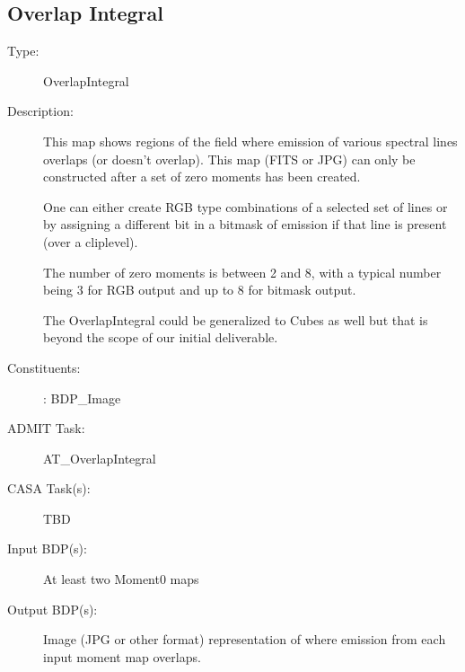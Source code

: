 \subsection{Overlap Integral}
\begin{description}
\item[Type:] OverlapIntegral
\item[Description:]

This map shows regions of the field where emission of various spectral
lines overlaps (or doesn't overlap). This map (FITS or JPG) can only be
constructed after a set of zero moments has been created.  

One can either create RGB type combinations of a selected set of lines
or by assigning a different bit in a bitmask of emission if that line is
present (over a cliplevel).

The number of zero moments is between 2 and 8, with a typical number
being 3 for RGB output and up to 8 for bitmask output.

The OverlapIntegral could be generalized to Cubes as well but that
is beyond the scope of our initial deliverable.

\item[Constituents:]: BDP\_Image

\item[ADMIT Task:]  AT\_OverlapIntegral

\item[CASA Task(s):] TBD

\item[Input BDP(s):] At least two Moment0 maps

\item[Output BDP(s):]  Image (JPG or other format) representation of where
emission from each input moment map overlaps.
\end{description}
